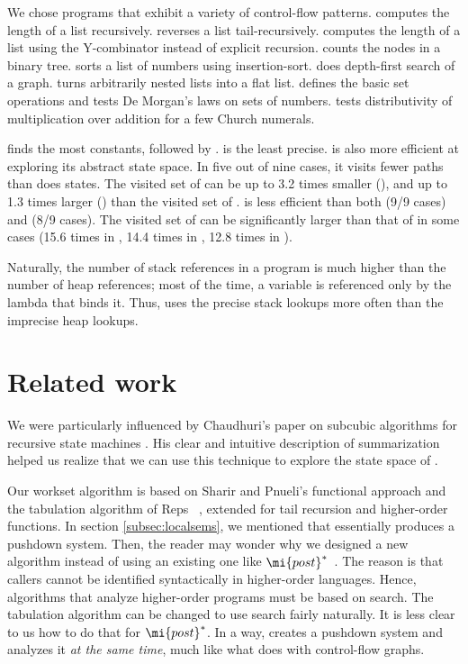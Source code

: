 \documentclass{LMCS}
\theoremstyle{definition} \newtheorem{property}[thm]{Property}
\begin{document}
We chose programs that exhibit a variety of control-flow patterns.
 computes the length of a list recursively. 
 reverses a list tail-recursively.
 computes the length of a list using the Y-combinator instead of
explicit recursion.
 counts the nodes in a binary tree.
 sorts a list of numbers using insertion-sort.
 does depth-first search of a graph.
 turns arbitrarily nested lists into a flat list.
 defines the basic set operations and tests De Morgan's laws on sets of
numbers.
 tests distributivity of multiplication over addition for
a few Church numerals.

\cfat{} finds the most constants, followed by .
 is the least precise.
\cfat{} is also more efficient at exploring its abstract state space.
In five out of nine cases, it visits fewer paths than  does states.
The visited set of \cfat{} can be up to 3.2 times smaller (), 
and up to 1.3 times larger () than the visited set of .
 is less efficient than both  (9/9 cases) and \cfat{} (8/9 cases).
The visited set of  can be significantly larger than that of \cfat{} in 
some cases (15.6 times in , 14.4 times in , 
12.8 times in ).

Naturally, the number of stack references in a program is much higher than
the number of heap references; 
most of the time, a variable is referenced only by the lambda that binds it.
Thus, \cfat{} uses the precise stack lookups more often than the imprecise
heap lookups.


\section{Related work\label{sec:related}}

\noindent We were particularly influenced by Chaudhuri's paper on subcubic algorithms for
recursive state machines \cite{conf/popl/08/chaudhuri/subcubic}.
His clear and intuitive description of summarization helped us realize that we
can use this technique to explore the state space of \cfat.

Our workset algorithm is based on Sharir and Pnueli's functional approach 
\cite[pg.\ 207]{book/flowanalysis/81/sharir/interproc} and the tabulation 
algorithm of Reps \etal~\cite{conf/popl/95/reps/interproc}, extended for tail
recursion and higher-order functions.
In section \ref{subsec:localsems}, we mentioned that \cfat{} essentially 
produces a pushdown system.
Then, the reader may wonder why we designed a new algorithm instead of using an
existing one like $\mi{post}^*$~\cite{journal/entcs/97/finkel/pds, 
conf/concur/97/bouajjani/pds}.
The reason is that callers cannot be identified syntactically in higher-order
languages.
Hence, algorithms that analyze higher-order programs must be based on search.
The tabulation algorithm can be changed to use search fairly naturally.
It is less clear to us how to do that for $\mi{post}^*$.
In a way, \cfat{} creates a pushdown system and analyzes it \emph{at the same
time}, much like what \kcfa{} does with control-flow graphs.
\end{document}
